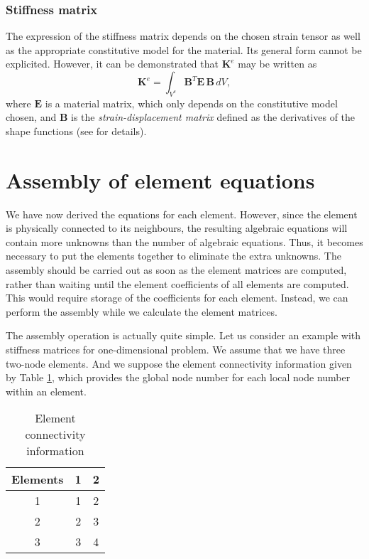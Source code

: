 		
		\subsubsection*{Stiffness matrix}
The expression of the stiffness matrix depends on the chosen strain tensor as well as the appropriate constitutive model for the material. Its general form cannot be explicited. However, it can be demonstrated that $ \mathbf{K}^e $ may be written as
\begin{equation}
\mathbf{K}^e = \int_{V^e} \mathbf{B}^T \mathbf{E} \, \mathbf{B} \, dV,
\end{equation}
where $ \mathbf{E} $ is a material matrix, which only depends on the constitutive model chosen, and $ \mathbf{B} $ is the \emph{strain-displacement matrix} defined as the derivatives of the shape functions (see \cite{Liu03,Belytschko00} for details). 
	
	

\section{Assembly of element equations}
We have now derived the equations for each element. However, since the element is physically connected to its neighbours, the resulting algebraic equations will contain more unknowns than the number of algebraic equations. Thus, it becomes necessary to put the elements together to eliminate the extra unknowns. The assembly should be carried out as soon as the element matrices are computed, rather than waiting until the element coefficients of all elements are computed. This would require storage of the coefficients for each element. Instead, we can perform the assembly while we calculate the element matrices.  

The assembly operation is actually quite simple. Let us consider an example with stiffness matrices for one-dimensional problem. We assume that we have three two-node elements. And we suppose the element connectivity information given by Table \ref{chap3:connectivity}, which provides the global node number for each local node number within an element. 
\begin{table}
	\begin{center}
	\begin{tabular}{|c|c|c|}
		\hline Elements & 1 & 2 \\ 
		\hline 1 & 1 & 2 \\ 
		\hline 2 & 2 & 3 \\ 
		\hline 3 & 3 & 4 \\ 
		\hline 
		\end{tabular} \caption{Element connectivity information}
		\label{chap3:connectivity}
	\end{center}
\end{table}

